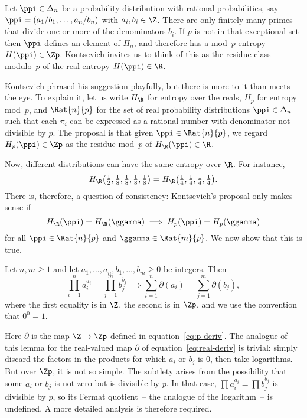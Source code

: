 Let $\ppi \in \Delta_n$ be a probability distribution with
rational probabilities, say $\ppi = (a_1/b_1, \ldots, a_n/b_n)$ with $a_i,
b_i \in \Z$.  There are only finitely many primes that divide one or more
of the denominators $b_i$.  If $p$ is not in that exceptional set then
$\ppi$ defines an element of $\Pi_n$, and therefore has a mod~$p$ entropy
$H(\ppi) \in \Zp$.  Kontsevich invites us to think of this as the residue%
%
% 
class modulo~$p$ of the real entropy $H(\ppi) \in \R$.

Kontsevich phrased his suggestion playfully, but there is more to it than
meets the eye.  To explain it, let us write $H_\R$ for
entropy over the reals, $H_p$ for entropy mod~$p$, and
$\Rat{n}{p}$ for the set of real probability distributions
$\ppi \in \Delta_n$ such that each $\pi_i$ can be expressed as a rational
number with denominator not divisible by $p$.  The proposal is that given
$\ppi \in \Rat{n}{p}$, we regard $H_p(\ppi) \in \Zp$ as the residue mod~$p$
of $H_\R(\ppi) \in \R$.

Now, different distributions can have the same entropy over $\R$.  For
instance, 
\[
H_\R\bigl(\tfrac{1}{2}, 
\tfrac{1}{8}, \tfrac{1}{8}, \tfrac{1}{8}, \tfrac{1}{8}\bigr)
=
H_\R\bigl(\tfrac{1}{4}, \tfrac{1}{4}, \tfrac{1}{4}, \tfrac{1}{4}\bigr).
\]
There is, therefore, a question of consistency: Kontsevich's proposal only
makes sense if
\[
H_\R(\ppi) = H_\R(\ggamma) \implies H_p(\ppi) = H_p(\ggamma)
\]
for all $\ppi \in \Rat{n}{p}$ and $\ggamma \in \Rat{m}{p}$.  We now show
that this is true.

\begin{lemma}
Let $n, m \geq 1$ and let $a_1, \ldots, a_n, b_1, \ldots, b_m \geq 0$ be
integers.  Then
\[
\prod_{i = 1}^n a_i^{a_i} = \prod_{j = 1}^m b_j^{b_j}
\implies
\sum_{i = 1}^n \partial(a_i) = \sum_{j = 1}^m \partial(b_j),
\]
where the first equality is in $\Z$, the second is in $\Zp$, and we use the
convention that $0^0 = 1$.
\end{lemma}

Here $\partial$ is the map $\Z \to \Zp$ defined in
equation~\eqref{eq:p-deriv}.  The analogue of this lemma for the
real-valued map $\partial$ of equation~\eqref{eq:real-deriv} is trivial:
simply discard the factors in the products for which $a_i$ or $b_j$ is $0$,
then take logarithms.  But over $\Zp$, it is not so simple.  The subtlety
arises from the possibility that some $a_i$ or $b_j$ is not zero but is
divisible by $p$.  In that case, $\prod a_i^{a_i} = \prod b_j^{b_j}$ is
divisible by $p$, so its Fermat quotient~-- the analogue of the
logarithm~-- is undefined.  A more detailed analysis is therefore
required. 

